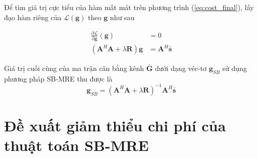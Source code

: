Để tìm giá trị cực tiểu của hàm mất mát trên phương trình (\ref{eq:cost_final}), lấy đạo hàm riêng của $\mathcal{L}(\mathbf{g})$ theo $\mathbf{g}$ như sau 

\begin{equation}
\begin{aligned}
\frac{\partial \mathcal{L}}{\partial \mathbf{g}}(\mathbf{g}) &= 0 \\
\left(\mathbf{A}^H \mathbf{A}+\lambda \mathbf{R}\right) \mathbf{g} &= \mathbf{A}^H \bar{\mathbf{s}}
\end{aligned}
\end{equation}

Giá trị cuối cùng của ma trận cân bằng kênh $\bar{\mathbf{G}}$ dưới dạng véc-tơ $\mathbf{g}_{SB}$ sử dụng phương pháp SB-MRE thu được là
\begin{equation}
    \mathbf{g}_{SB}=\left(\mathbf{A}^H \mathbf{A} + \lambda \mathbf{R}\right)^{-1} \mathbf{A}^H \bar{\mathbf{s}}
\end{equation}

\section{Đề xuất giảm thiểu chi phí của thuật toán SB-MRE}



